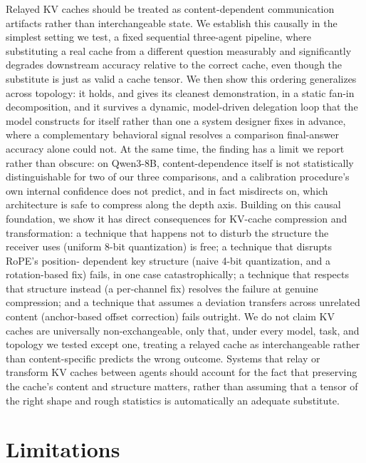 \documentclass[11pt]{article}
\begin{document}
Relayed KV caches should be treated as content-dependent communication
artifacts rather than interchangeable state. We establish this causally
in the simplest setting we test, a fixed sequential three-agent pipeline,
where substituting a real cache from a different question measurably and
significantly degrades downstream accuracy relative to the correct cache,
even though the substitute is just as valid a cache tensor. We then show
this ordering generalizes across topology: it holds, and gives its
cleanest demonstration, in a static fan-in decomposition, and it survives
a dynamic, model-driven delegation loop that the model constructs for
itself rather than one a system designer fixes in advance, where a
complementary behavioral signal resolves a comparison final-answer
accuracy alone could not. At the same time, the finding has a limit we
report rather than obscure: on Qwen3-8B, content-dependence itself is not
statistically distinguishable for two of our three comparisons, and a
calibration procedure's own internal confidence does not predict, and in
fact misdirects on, which architecture is safe to compress along the
depth axis. Building on this causal foundation, we show it has direct
consequences for KV-cache compression and transformation: a technique
that happens not to disturb the structure the receiver uses (uniform
8-bit quantization) is free; a technique that disrupts RoPE's position-
dependent key structure (naive 4-bit quantization, and a rotation-based
fix) fails, in one case catastrophically; a technique that respects that
structure instead (a per-channel fix) resolves the failure at genuine
compression; and a technique that assumes a deviation transfers across
unrelated content (anchor-based offset correction) fails outright. We do
not claim KV caches are universally non-exchangeable, only that, under
every model, task, and topology we tested except one, treating a relayed
cache as interchangeable rather than content-specific predicts the wrong
outcome. Systems that relay or transform KV caches between agents should
account for the fact that preserving the cache's content and structure
matters, rather than assuming that a tensor of the right shape and rough
statistics is automatically an adequate substitute.

\section*{Limitations}
\end{document}
